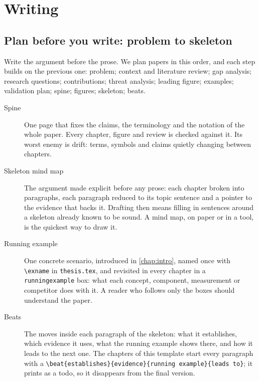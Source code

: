 \clearpage\section{Writing}\label{app:writing}
\subsection{Plan before you write: problem to skeleton}\label{app:writing:spine}
Write the argument before the prose. We plan papers in this order, and each step builds on the previous one: problem; context and literature review; gap analysis; research questions; contributions; threat analysis; leading figure; examples; validation plan; spine; figures; skeleton; beats.
\begin{description}
  \item[Spine] One page that fixes the claims, the terminology and the notation of the whole paper. Every chapter, figure and review is checked against it. Its worst enemy is drift: terms, symbols and claims quietly changing between chapters.
  \item[Skeleton mind map] The argument made explicit before any prose: each chapter broken into paragraphs, each paragraph reduced to its topic sentence and a pointer to the evidence that backs it. Drafting then means filling in sentences around a skeleton already known to be sound. A mind map, on paper or in a tool, is the quickest way to draw it.
  \item[Running example] One concrete scenario, introduced in \cref{chap:intro}, named once with \texttt{\textbackslash exname} in \texttt{thesis.tex}, and revisited in every chapter in a \texttt{runningexample} box: what each concept, component, measurement or competitor does with it. A reader who follows only the boxes should understand the paper.
  \item[Beats] The moves inside each paragraph of the skeleton: what it establishes, which evidence it uses, what the running example shows there, and how it leads to the next one. The chapters of this template start every paragraph with a \texttt{\textbackslash beat\{establishes\}\{evidence\}\{running example\}\{leads to\}}; it prints as a todo, so it disappears from the final version.
\end{description}

